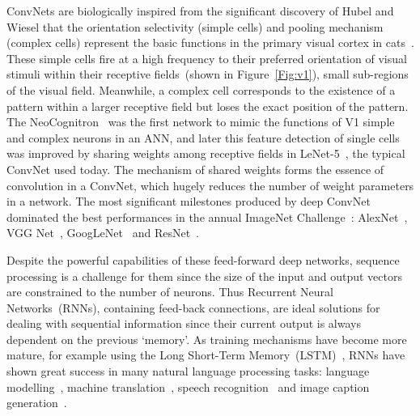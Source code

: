 ConvNets are biologically inspired from the significant discovery of Hubel and Wiesel that the orientation selectivity (simple cells) and pooling mechanism (complex cells) represent the basic functions in the primary visual cortex in cats~\citep{hubel1962receptive}.
These simple cells fire at a high frequency to their preferred orientation of visual stimuli within their receptive fields~(shown in Figure~\ref{Fig:v1}), small sub-regions of the visual field.
Meanwhile, a complex cell corresponds to the existence of a pattern within a larger receptive field but loses the exact position of the pattern.
The NeoCognitron~\citep{fukushima1982neocognitron} was the first network to mimic the functions of V1 simple and complex neurons in an ANN, and later this feature detection of single cells was improved by sharing weights among receptive fields in LeNet-5~\citep{lecun1998gradient}, the typical ConvNet used today.
The mechanism of shared weights forms the essence of convolution in a ConvNet, which hugely reduces the number of weight parameters in a network.
The most significant milestones produced by deep ConvNet dominated the best performances in the annual ImageNet Challenge~\citep{russakovsky2015imagenet}: AlexNet~\citep{krizhevsky2012imagenet}, VGG Net~\citep{simonyan2014very}, GoogLeNet~\citep{szegedy2015going} and ResNet~\citep{he2016deep}.

Despite the powerful capabilities of these feed-forward deep networks, sequence processing is a challenge for them since the size of the input and output vectors are constrained to the number of neurons.
Thus Recurrent Neural Networks~(RNNs), containing feed-back connections, are ideal solutions for dealing with sequential information since their current output is always dependent on the previous `memory'.
As training mechanisms have become more mature, for example using the Long Short-Term Memory~(LSTM)~\citep{hochreiter1997long}, RNNs have shown great success in many natural language processing tasks: language modelling~\citep{mikolov2010recurrent}, machine translation~\citep{sutskever2014sequence}, speech recognition~\citep{graves2014towards} and image caption generation~\citep{karpathy2015deep}.

